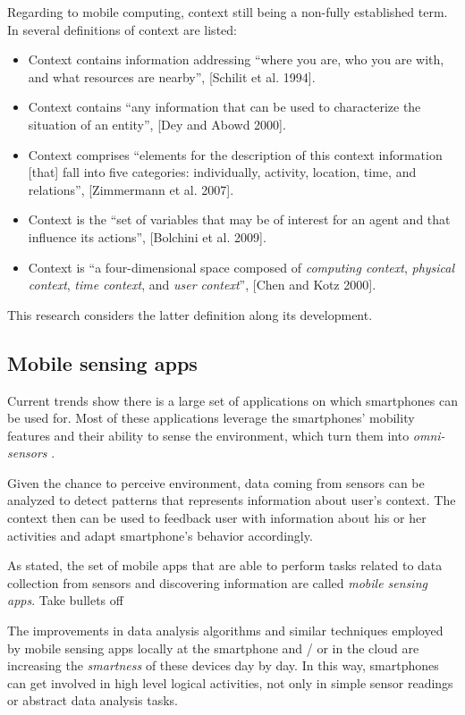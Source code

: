 Regarding to mobile computing, context still being a non-fully established term.
In \cite{Bellavista2012} several definitions of context are listed:
\begin{itemize}
  \item{Context contains information addressing ``where you are, who you are with, and what resources are nearby'', [Schilit et al. 1994]}.
  \item{Context contains ``any information that can be used to characterize the situation of an entity'', [Dey and Abowd 2000]}.
  \item{Context comprises ``elements for the description of this context information [that] fall into five categories: individually, activity, location, time, and relations'', [Zimmermann et al. 2007]}.
  \item{Context is the ``set of variables that may be of interest for an agent and that influence its actions'', [Bolchini et al. 2009]}.
  \item{Context is ``a four-dimensional space composed of \emph{computing context}, \emph{physical context}, \emph{time context}, and \emph{user context}'', [Chen and Kotz 2000]}.
\end{itemize}

This research considers the latter definition along its development.


\subsection{Mobile sensing apps}
\label{sub:mobile_sensing_apps}

Current trends show there is a large set of applications on which smartphones can be used for. Most of these applications leverage the smartphones’ mobility features and their ability to sense the environment, which turn them into \emph{omni-sensors} \cite{Perez-Torres2012}.

Given the chance to perceive environment, data coming from sensors can be analyzed to detect patterns that represents information about user’s context.
The context then can be used to feedback user with information about his or her activities and adapt smartphone’s behavior accordingly.

As stated, the set of mobile apps that are able to perform tasks related to data collection from sensors and discovering information are called \emph{mobile sensing apps}.
{Take bullets off}

The improvements in data analysis algorithms and similar techniques employed by mobile sensing apps locally at the smartphone and / or in the cloud are increasing the \emph{smartness} of these devices day by day.
In this way, smartphones can get involved in high level logical activities, not only in simple sensor readings or abstract data analysis tasks.

